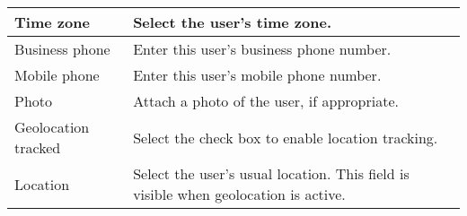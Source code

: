 \begin{table}[htpb]
\begin{tabular}{|p{3cm}|p{12cm}|}
\hline
Time zone & Select the user's time zone. \\ 
\hline
Business phone & Enter this user's business phone number. \\ 
\hline
Mobile phone & Enter this user's mobile phone number. \\ 
\hline
Photo & Attach a photo of the user, if appropriate. \\ 
\hline
Geolocation tracked & Select the check box to enable location tracking. \\ 
\hline
Location & Select the user's usual location. This field is visible when geolocation is active. \\ 
\hline
\end{tabular}
\end{table}